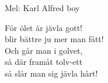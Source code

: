 \begin{SongText}
    \begin{SongInfo}
        Mel: Karl Alfred boy
    \end{SongInfo}
    \begin{SongVerse}
        För ölet är jävla gott!\\%
        blir bättre ju mer man fått!\\%
        Och går man i golvet,\\%
        så där framåt tolv-ett\\%
        så slår man sig jävla hårt!
    \end{SongVerse}
\end{SongText}
